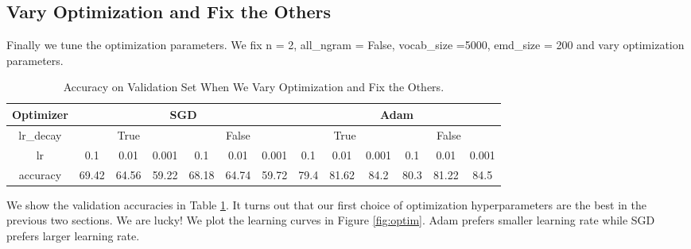 \documentclass[10pt,a4paper]{article}
\begin{document}
\subsection{Vary Optimization and Fix the Others}
Finally we tune the optimization parameters. We fix n = 2, all\_ngram = False, vocab\_size =5000, emd\_size = 200 and vary optimization parameters.
\begin{table}[!ht]
\centering
\begin{tabular}{|c|c|c|c|c|c|c|c|c|c|c|c|c|}
\hline
Optimizer & \multicolumn{6}{|c|}{SGD} & \multicolumn{6}{|c|}{Adam} \\ \hline
lr\_decay & \multicolumn{3}{|c|}{True}& \multicolumn{3}{|c|}{False} &\multicolumn{3}{|c|}{True}& \multicolumn{3}{|c|}{False}\\ \hline
lr & 0.1 & 0.01 & 0.001 & 0.1 & 0.01 & 0.001 & 0.1 & 0.01 & 0.001 & 0.1 & 0.01 & 0.001\\ \hline
accuracy & 69.42 &64.56 & 59.22&68.18 &64.74 & 59.72&79.4& 81.62& 84.2 &80.3& 81.22 & 84.5 \\ \hline
\end{tabular}
\caption{\label{tab: optim}Accuracy on Validation Set When We Vary Optimization and Fix the Others.}
\end{table}
We show the validation accuracies in Table \ref{tab: optim}. It turns out that our first choice of optimization hyperparameters are the best in the previous two sections. We are lucky! We plot the learning curves in Figure \ref{fig:optim}. Adam prefers smaller learning rate while SGD prefers larger learning rate.
\end{document}
